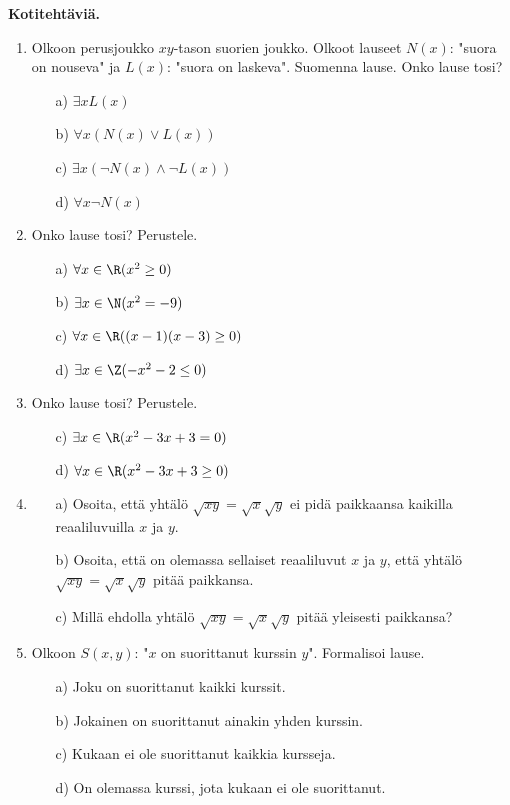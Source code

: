 {\bf Kotitehtäviä.}

\begin{enumerate}

\item Olkoon perusjoukko $xy$-tason suorien joukko. Olkoot
lauseet $N(x)$: "suora on nouseva" ja $L(x)$: "suora on laskeva".
Suomenna lause. Onko lause tosi?
\begin{itemize}
\item[a)] $\exists x L(x)$
\item[b)] $\forall x (N(x) \lor L(x))$
\item[c)] $\exists x (\lnot N(x) \land \lnot L(x))$
\item[d)] $\forall x \lnot N(x)$
\end{itemize}

\item Onko lause tosi? Perustele.
\begin{itemize}
\item[a)] $\forall x\in\R (x^2 \ge 0)$
\item[b)] $\exists x\in\N (x^2 = -9)$
\item[c)] $\forall x\in\R ((x-1)(x-3) \ge 0)$
\item[d)] $\exists x\in\Z (-x^2 - 2 \le 0)$
\end{itemize}

\item Onko lause tosi? Perustele.
\begin{itemize}
\item[c)] $\exists x\in \R (x^2 - 3x + 3 = 0)$
\item[d)] $\forall x\in \R (x^2 - 3x + 3 \ge 0)$
\end{itemize}

\item
\begin{itemize}
\item[a)] Osoita, että yhtälö $\sqrt{xy} = \sqrt{x}\sqrt{y}$ ei
pidä paikkaansa kaikilla reaaliluvuilla $x$ ja $y$.
\item[b)] Osoita, että on olemassa sellaiset reaaliluvut $x$ ja
$y$, että yhtälö $\sqrt{xy} = \sqrt{x}\sqrt{y}$ pitää paikkansa.
\item[c)] Millä ehdolla yhtälö $\sqrt{xy} = \sqrt{x}\sqrt{y}$
pitää yleisesti paikkansa?
\end{itemize}

\item Olkoon $S(x,y)$: "$x$ on suorittanut kurssin $y$".
Formalisoi lause.
\begin{itemize}
\item[a)] Joku on suorittanut kaikki kurssit.
\item[b)] Jokainen on suorittanut ainakin yhden kurssin.
\item[c)] Kukaan ei ole suorittanut kaikkia kursseja.
\item[d)] On olemassa kurssi, jota kukaan ei ole suorittanut.
\end{itemize}


\end{enumerate}
